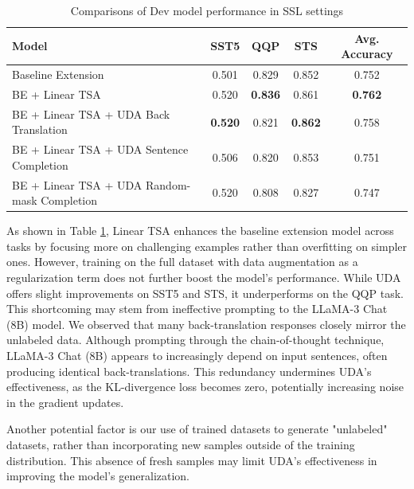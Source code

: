 \documentclass{article}
\begin{document}
\begin{table}[htbp]
  \centering
  \caption{Comparisons of Dev model performance in SSL settings}
  \label{tab:ssl_res}
  \begin{tabular}{@{}lcccc@{}}
    \toprule
    \textbf{Model}                               & \textbf{SST5}  & \textbf{QQP}   & \textbf{STS}   & \textbf{Avg. Accuracy} \\ \midrule
    Baseline Extension                           & 0.501          & 0.829          & 0.852          & 0.752                  \\
    BE + Linear TSA                              & 0.520          & \textbf{0.836} & 0.861          & \textbf{0.762}         \\
    BE + Linear TSA + UDA Back Translation       & \textbf{0.520} & 0.821          & \textbf{0.862} & 0.758                  \\
    BE + Linear TSA + UDA Sentence Completion    & 0.506          & 0.820          & 0.853          & 0.751                  \\
    BE + Linear TSA + UDA Random-mask Completion & 0.520          & 0.808          & 0.827          & 0.747                  \\ \bottomrule
    \end{tabular}
\end{table}

As shown in Table \ref{tab:ssl_res}, Linear TSA enhances the baseline extension model 
across tasks by focusing more on challenging examples rather than overfitting on simpler ones. 
However, training on the full dataset with data augmentation as a regularization term does 
not further boost the model's performance.
While UDA offers slight improvements on SST5 and STS, it underperforms on the QQP task. This 
shortcoming may stem from ineffective prompting to the LLaMA-3 Chat (8B) model. We observed 
that many back-translation responses closely mirror the unlabeled data. 
Although prompting through the chain-of-thought technique, LLaMA-3 Chat (8B) appears to 
increasingly depend on input sentences, often producing identical back-translations. 
This redundancy undermines UDA's effectiveness, as the KL-divergence loss becomes zero, 
potentially increasing noise in the gradient updates.

Another potential factor is our use of trained datasets to generate "unlabeled" datasets, 
rather than incorporating new samples outside of the training distribution. This absence 
of fresh samples may limit UDA's effectiveness in improving the model's generalization.
\end{document}

